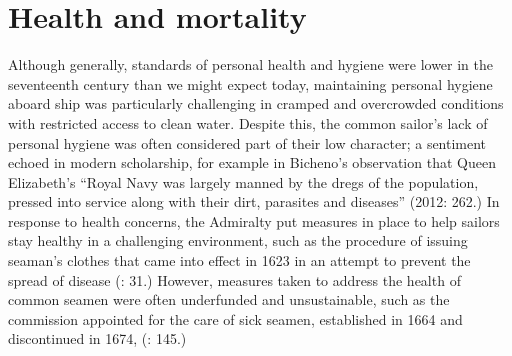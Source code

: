 \section{{Health} {and} {mortality}  }%

Although generally, standards of personal health and hygiene were lower in the seventeenth century than we might expect today, maintaining personal hygiene aboard ship was particularly challenging in cramped and overcrowded conditions with restricted access to clean water. Despite this, the common sailor’s lack of personal hygiene was often considered part of their low character; a sentiment echoed in modern scholarship, for example in Bicheno’s observation that Queen Elizabeth’s “Royal Navy was largely manned by the dregs of the population, pressed into service along with their dirt, parasites and diseases” (2012: 262.) In response to health concerns, the Admiralty put measures in place to help sailors stay healthy in a challenging environment, such as the procedure of issuing seaman’s clothes that came into effect in 1623 in an attempt to prevent the spread of disease (\citealt{Brown2011}: 31.) However, measures taken to address the health of common seamen were often underfunded and unsustainable, such as the commission appointed for the care of sick seamen, established in 1664 and discontinued in 1674, (\citealt{Lincoln2015}: 145.)

